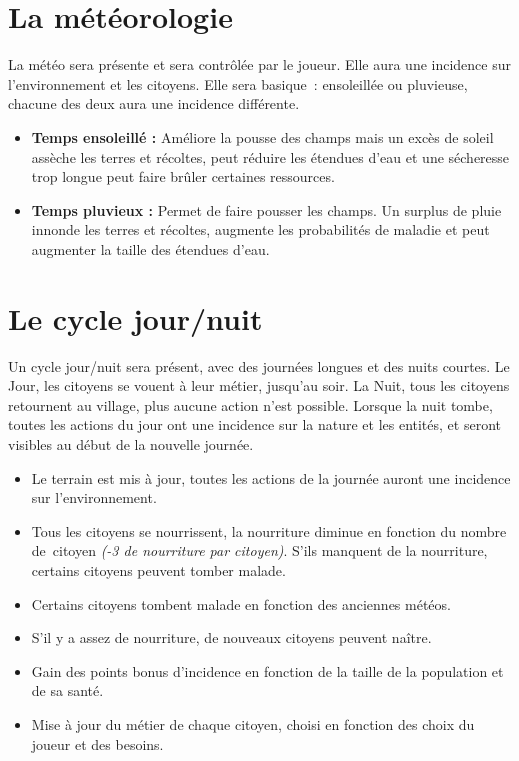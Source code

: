 \documentclass[a4paper]{article}
\begin{document}
\section*{La météorologie}
La météo sera présente et sera contrôlée par le joueur. Elle aura une incidence sur l'environnement et les citoyens. Elle sera basique : ensoleillée ou pluvieuse, chacune des deux aura une incidence différente. 
\begin{itemize}
\item \textbf{Temps ensoleillé :} \small{ Améliore la pousse des champs mais un excès de soleil assèche les terres et récoltes, peut réduire les étendues d'eau et une sécheresse trop longue peut faire brûler certaines ressources.}
\item \textbf{Temps pluvieux :} \small{ Permet de faire pousser les champs. Un surplus de pluie innonde les terres et récoltes, augmente les probabilités de maladie et peut augmenter la taille des étendues d'eau.}
\end{itemize}

\section*{Le cycle jour/nuit}
Un cycle jour/nuit sera présent, avec des journées longues et des nuits courtes. Le Jour, les citoyens se vouent à leur métier, jusqu'au soir. La Nuit, tous les citoyens retournent au village, plus aucune action n'est possible. Lorsque la nuit tombe, toutes les actions du jour ont une incidence sur la nature et les entités, et seront visibles au début de la nouvelle journée.
\begin{itemize} \small
\item Le terrain est mis à jour, toutes les actions de la journée auront une incidence sur l'environnement.
\item Tous les citoyens se nourrissent, la nourriture diminue en fonction du nombre de citoyen \textit{(-3 de nourriture par citoyen)}. S'ils manquent de la nourriture, certains citoyens peuvent tomber malade.
\item Certains citoyens tombent malade en fonction des anciennes météos.
\item S'il y a assez de nourriture, de nouveaux citoyens peuvent naître.
\item Gain des points bonus d'incidence en fonction de la taille de la population et de sa santé.
\item Mise à jour du métier de chaque citoyen, choisi en fonction des choix du joueur et des besoins.
\end{itemize} \normalsize
\end{document}
